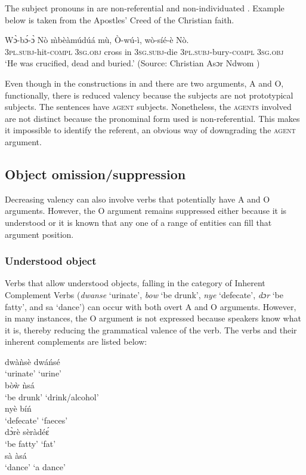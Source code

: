 \documentclass[output=paper]{langsci/langscibook}
\begin{document}
The subject pronouns in  are non-referential and non-individuated \citep{hopperthompson1980}. Example  below is taken from the Apostles' Creed of the Christian faith. 

\ea
\label{ex:36.osam}
\gll Wɔ̀-bɔ́-ɔ̀       Nò    \`{m}bèàmúdúá  mù, Ò-wú-ì,     wò-síé-è     Nò.\\
     \textsc{3pl.subj}-hit\textsc{-compl}  \textsc{3sg.obj}  cross in \textsc{3sg.subj}-die  \textsc{3pl.subj}-bury\textsc{-compl}  \textsc{3sg.obj}\\
\glt `He was crucified, dead and buried.' (Source: Christian Asɔr Ndwom \citep{methodist1937})
\z

Even though in the constructions in  and  there are two arguments, A and O, functionally, there is reduced valency because the subjects are not prototypical subjects. The sentences have \textsc{agent} subjects. Nonetheless, the \textsc{agents} involved are not distinct because the pronominal form used is non-referential. This makes it impossible to identify the referent, an obvious way of downgrading the \textsc{agent} argument.

\subsection{Object omission/suppression}\label{§4.5:object.osam}

Decreasing valency can also involve verbs that potentially have A and O arguments. However, the O argument remains suppressed either because it is understood or it is known that any one of a range of entities can fill that argument position.

\subsubsection{Understood object}\label{§4.5.1:understood.osam}

Verbs that allow understood objects, falling in the category of Inherent Complement Verbs (\textit{dwanse} `urinate', \textit{bow} `be drunk', \textit{nye} `defecate', \textit{dɔr} `be fatty', and sa `dance') can occur with both overt A and O arguments. However, in many instances, the O argument is not expressed because speakers know what it is, thereby reducing the grammatical valence of the verb. The verbs and their inherent complements are listed below:

\ea\label{ex:37.osam}
\ea\label{ex:37a.osam}
\gll  dwàǹsè   dwáńsé\\
   `urinate'  `urine' \\
\ex\label{ex:37b.osam}
\gll   bòẁ    ǹsá\\ 
  {`be drunk'}  `drink/alcohol'\\
\ex\label{ex:37c.osam}
\gll   nyè    bíń\\ 
  `defecate'  `faeces' \\
\ex\label{ex:37d.osam}
\gll    dɔ̀rè    sèràdé\'{ɛ}\\
  {`be fatty'}  `fat'  \\
\ex\label{ex:37e.osam}
\gll    sà    àsá\\
   `dance'    {`a dance'}  \\
\z 
\z 
\end{document}
